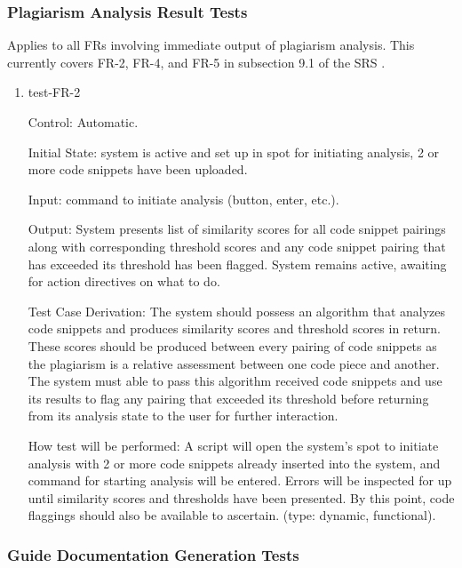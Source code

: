 \documentclass[12pt, titlepage]{article}
\begin{document}
\subsubsection{Plagiarism Analysis Result Tests}

Applies to all FRs involving immediate output of plagiarism analysis. This 
currently covers FR-2, FR-4, and FR-5 in subsection 9.1 of the SRS \citep{SRS}.

\begin{enumerate}

\item{test-FR-2\\}

Control: Automatic.
					
Initial State: system is active and set up in spot for initiating analysis, 
2 or more code snippets have been uploaded.
					
Input: command to initiate analysis (button, enter, etc.).
					
Output: System presents list of similarity scores for all code snippet pairings 
along with corresponding threshold scores and any code snippet pairing that 
has exceeded its threshold has been flagged. System remains active, 
awaiting for action directives on what to do.

Test Case Derivation: The system should possess an algorithm that analyzes code 
snippets and produces similarity scores and threshold scores in return. These 
scores should be produced between every pairing of code snippets as the 
plagiarism is a relative assessment between one code piece and another. The 
system must able to pass this algorithm received code snippets and use its
results to flag any pairing that exceeded its threshold before returning from
its analysis state to the user for further interaction.

How test will be performed: A script will open the system's spot to initiate analysis 
with 2 or more code snippets already inserted into the system, and command for 
starting analysis will be entered. Errors will be inspected for 
up until similarity scores and thresholds have been presented. By this point,
code flaggings should also be available to ascertain. (type: dynamic, functional).
					

\end{enumerate}

\subsubsection{Guide Documentation Generation Tests}
\end{document}
